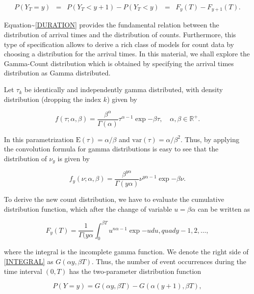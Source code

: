 \documentclass[9pt,a5paper,]{book}
\begin{document}
\begin{eqnarray}
\label{DURATION}
P(Y_T = y) &=& P(Y_T < y+1) - P(Y_T < y)
       &=& F_y(T) - F_{y+1}(T).
\end{eqnarray}

Equation\textasciitilde{}\ref{DURATION} provides the fundamental
relation between the distribution of arrival times and the distribution
of counts. Furthermore, this type of specification allows to derive a
rich class of models for count data by choosing a distribution for the
arrival times. In this material, we shall explore the Gamma-Count
distribution which is obtained by specifying the arrival times
distribution as Gamma distributed.

Let \(\tau_k\) be identically and independently gamma distributed, with
density distribution (dropping the index \(k\)) given by

\begin{equation}
f(\tau; \alpha, \beta) = \frac{\beta^{\alpha}}{\Gamma(\alpha)} \tau^{\alpha-1} \exp{-\beta \tau}, \quad \alpha, \beta \in \mathbb{R}^{+}.
\end{equation}

In this parametrization \(\mathrm{E}(\tau) = \alpha/\beta\) and
\(\mathrm{var}(\tau) = \alpha/\beta^2\). Thus, by applying the
convolution formula for gamma distributions is easy to see that the
distribution of \(\nu_y\) is given by

\begin{equation}
f_y(\nu; \alpha, \beta) = \frac{\beta^{y\alpha}}{\Gamma(y\alpha)} \nu^{y\alpha-1} \exp{-\beta \nu}.
\end{equation}

To derive the new count distribution, we have to evaluate the cumulative
distribution function, which after the change of variable
\(u = \beta \alpha\) can be written as

\begin{equation}
\label{INTEGRAL}
F_y(T) = \frac{1}{\Gamma(y\alpha} \int_0^{\beta T} u^{n\alpha -1} \exp{-u}du, quad y - 1, 2, \ldots,
\end{equation}

where the integral is the incomplete gamma function. We denote the right
side of \ref{INTEGRAL} as \(G(\alpha y, \beta T)\). Thus, the number of
event occurrences during the time interval \((0,T)\) has the
two-parameter distribution function

\begin{equation}
\label{MASSFUNCTION}
P(Y = y) = G(\alpha y, \beta T) - G(\alpha (y + 1), \beta T),
\end{equation}
\end{document}
